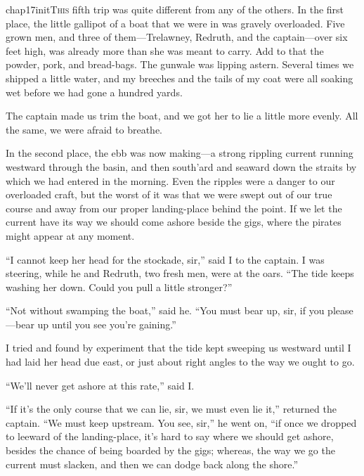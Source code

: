 
   \lettrine[lines=4,image=true]{chap17initT}{his} fifth trip was quite different from any of the others. In the first place, the little gallipot of a boat that we were in was gravely overloaded. Five grown men, and three of them---Trelawney, Redruth, and the captain---over six feet high, was already more than she was meant to carry. Add to that the powder, pork, and bread-bags. The gunwale was lipping astern. Several times we shipped a little water, and my breeches and the tails of my coat were all soaking wet before we had gone a hundred yards.

The captain made us trim the boat, and we got her to lie a little more evenly. All the same, we were afraid to breathe.

In the second place, the ebb was now making---a strong rippling current running westward through the basin, and then south’ard and seaward down the straits by which we had entered in the morning. Even the ripples were a danger to our overloaded craft, but the worst of it was that we were swept out of our true course and away from our proper landing-place behind the point. If we let the current have its way we should come ashore beside the gigs, where the pirates might appear at any moment.

\enquote{I cannot keep her head for the stockade, sir,} said I to the captain. I was steering, while he and Redruth, two fresh men, were at the oars. \enquote{The tide keeps washing her down. Could you pull a little stronger?}

\enquote{Not without swamping the boat,} said he. \enquote{You must bear up, sir, if you please---bear up until you see you’re gaining.}

I tried and found by experiment that the tide kept sweeping us westward until I had laid her head due east, or just about right angles to the way we ought to go.

\enquote{We’ll never get ashore at this rate,} said I.

\enquote{If it’s the only course that we can lie, sir, we must even lie it,} returned the captain. \enquote{We must keep upstream. You see, sir,} he went on, \enquote{if once we dropped to leeward of the landing-place, it’s hard to say where we should get ashore, besides the chance of being boarded by the gigs; whereas, the way we go the current must slacken, and then we can dodge back along the shore.}


